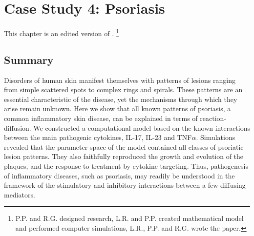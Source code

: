 \chapter{Case Study 4: Psoriasis}

This chapter is an edited version of  \citep{ringham2019}. \footnote{P.P. and R.G. designed research, L.R. and P.P. created mathematical model and performed computer simulations, L.R., P.P. and R.G. wrote the paper.}

\section{Summary} 
Disorders of human skin manifest themselves with patterns of lesions ranging from simple scattered spots to complex rings and spirals. These patterns are an essential characteristic of the disease, yet the mechanisms through which they arise remain unknown. Here we show that all known patterns of psoriasis, a common inflammatory skin disease, can be explained in terms of reaction-diffusion. We constructed a computational model based on the known interactions between the main pathogenic cytokines, IL-17, IL-23 and TNF$\alpha$. Simulations revealed that the parameter space of the model contained all classes of psoriatic lesion patterns. They also faithfully reproduced the growth and evolution of the plaques, and the response to treatment by cytokine targeting. Thus, pathogenesis of inflammatory diseases, such as psoriasis, may readily be understood in the framework of the stimulatory and inhibitory interactions between a few diffusing mediators.

